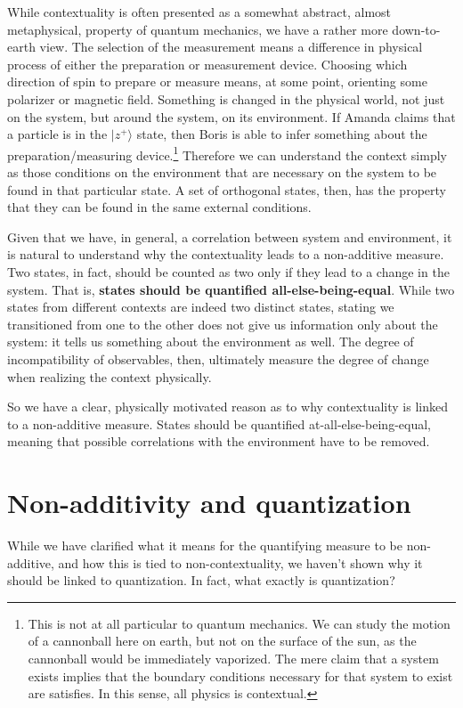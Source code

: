 \documentclass[10pt,twocolumn, nofootinbib]{revtex4-2}
\def\>{\rangle}
\begin{document}
While contextuality is often presented as a somewhat abstract, almost metaphysical, property of quantum mechanics, we have a rather more down-to-earth view. The selection of the measurement means a difference in physical process of either the preparation or measurement device. Choosing which direction of spin to prepare or measure means, at some point, orienting some polarizer or magnetic field. Something is changed in the physical world, not just on the system, but around the system, on its environment. If Amanda claims that a particle is in the $|z^+\>$ state, then Boris is able to infer something about the preparation/measuring device.\footnote{This is not at all particular to quantum mechanics. We can study the motion of a cannonball here on earth, but not on the surface of the sun, as the cannonball would be immediately vaporized. The mere claim that a system exists implies that the boundary conditions necessary for that system to exist are satisfies. In this sense, all physics is contextual.} Therefore we can understand the context simply as those conditions on the environment that are necessary on the system to be found in that particular state. A set of orthogonal states, then, has the property that they can be found in the same external conditions.

Given that we have, in general, a correlation between system and environment, it is natural to understand why the contextuality leads to a non-additive measure. Two states, in fact, should be counted as two only if they lead to a change in the system. That is, \textbf{states should be quantified all-else-being-equal}. While two states from different contexts are indeed two distinct states, stating we transitioned from one to the other does not give us information only about the system: it tells us something about the environment as well. The degree of incompatibility of observables, then, ultimately measure the degree of change when realizing the context physically.

So we have a clear, physically motivated reason as to why contextuality is linked to a non-additive measure. States should be quantified at-all-else-being-equal, meaning that possible correlations with the environment have to be removed.

\section{Non-additivity and quantization}

While we have clarified what it means for the quantifying measure to be non-additive, and how this is tied to non-contextuality, we haven't shown why it should be linked to quantization. In fact, what exactly is quantization?
\end{document}
